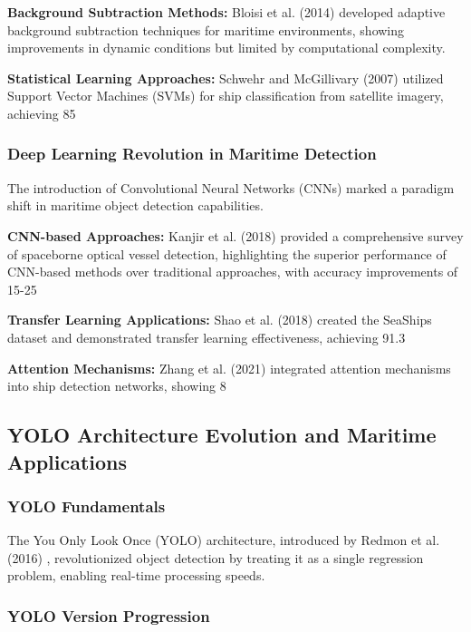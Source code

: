 \documentclass[a4paper,11pt]{article}
\begin{document}
\textbf{Background Subtraction Methods:} Bloisi et al. (2014) \cite{bloisi2014background} developed adaptive background subtraction techniques for maritime environments, showing improvements in dynamic conditions but limited by computational complexity.

\textbf{Statistical Learning Approaches:} Schwehr and McGillivary (2007) \cite{schwehr2007marine} utilized Support Vector Machines (SVMs) for ship classification from satellite imagery, achieving 85%

\subsubsection{Deep Learning Revolution in Maritime Detection}
The introduction of Convolutional Neural Networks (CNNs) marked a paradigm shift in maritime object detection capabilities.

\textbf{CNN-based Approaches:} Kanjir et al. (2018) \cite{kanjir2018vessel} provided a comprehensive survey of spaceborne optical vessel detection, highlighting the superior performance of CNN-based methods over traditional approaches, with accuracy improvements of 15-25%

\textbf{Transfer Learning Applications:} Shao et al. (2018) \cite{shao2018seaships} created the SeaShips dataset and demonstrated transfer learning effectiveness, achieving 91.3%

\textbf{Attention Mechanisms:} Zhang et al. (2021) \cite{zhang2021attention} integrated attention mechanisms into ship detection networks, showing 8%

\subsection{YOLO Architecture Evolution and Maritime Applications}

\subsubsection{YOLO Fundamentals}
The You Only Look Once (YOLO) architecture, introduced by Redmon et al. (2016) \cite{redmon2016you}, revolutionized object detection by treating it as a single regression problem, enabling real-time processing speeds.

\subsubsection{YOLO Version Progression}
\end{document}
